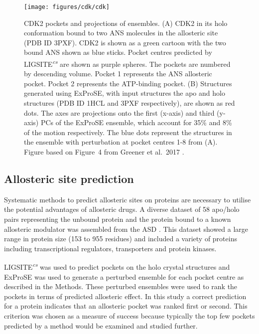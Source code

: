 \begin{figure}
\centering

\texttt{[image: figures/cdk/cdk]}

\caption[CDK2 pockets and projections of perturbed ExProSE ensembles]
{CDK2 pockets and projections of ensembles.
(A) CDK2 in its holo conformation bound to two ANS molecules in the allosteric site (PDB ID 3PXF).
CDK2 is shown as a green cartoon with the two bound ANS shown as blue sticks.
Pocket centres predicted by LIGSITE\textsuperscript{\it cs} are shown as purple spheres.
The pockets are numbered by descending volume.
Pocket 1 represents the ANS allosteric pocket.
Pocket 2 represents the ATP-binding pocket.
(B) Structures generated using ExProSE, with input structures the apo and holo structures (PDB ID 1HCL and 3PXF respectively), are shown as red dots.
The axes are projections onto the first (x-axis) and third (y-axis) PCs of the ExProSE ensemble, which account for 35\% and 8\% of the motion respectively.
The blue dots represent the structures in the ensemble with perturbation at pocket centres 1-8 from (A).
Figure based on Figure~4 from Greener et al.\ 2017 \cite{Greener2017}.}

\label{fig:cdk}
\end{figure}


\subsection{Allosteric site prediction}

Systematic methods to predict allosteric sites on proteins are necessary to utilise the potential advantages of allosteric drugs.
A diverse dataset of 58 apo/holo pairs representing the unbound protein and the protein bound to a known allosteric modulator was assembled from the ASD \cite{Shen2016}.
This dataset showed a large range in protein size (153 to 955 residues) and included a variety of proteins including transcriptional regulators, transporters and protein kinases.

LIGSITE\textsuperscript{\it cs} was used to predict pockets on the holo crystal structures and ExProSE was used to generate a perturbed ensemble for each pocket centre as described in the Methods.
These perturbed ensembles were used to rank the pockets in terms of predicted allosteric effect.
In this study a correct prediction for a protein indicates that an allosteric pocket was ranked first or second.
This criterion was chosen as a measure of success because typically the top few pockets predicted by a method would be examined and studied further.

